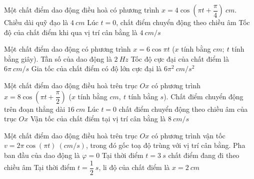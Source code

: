 \setcounter{ex}{0}
\setcounter{paragraph}{0}
\PhanII
\begin{ex}
Một chất điểm dao động điều hoà có phương trình $x=4 \cos (\pi t+\dfrac{\pi}{4})\ cm$.
{Chiều dài quỹ đạo là $4 \ cm$}
{\True Lúc $t=0$, chất điểm chuyển động theo chiều âm}
{Tốc độ của chất điểm khi qua vị trí cân bằng là $4 \ cm/s$}
\loigiai{
\begin{itemchoice}
\itemch
\itemch
\itemch
\itemch
\end{itemchoice}
}
\end{ex} 
\begin{ex}
Một chất điểm dao động có phương trình $x=6 \cos \pi t$ ($x$ tính bằng $cm;\ t$ tính bằng giây).
{Tần số của dao động là $2 \ Hz$}
{\True Tốc độ cực đại của chất điểm là $6 \pi\ cm/s$}
{\True Gia tốc của chất điểm có độ lớn cực đại là $6 \pi^2 \ cm/s^2$}
\loigiai{
\begin{itemchoice}
\itemch
\itemch
\itemch
\itemch
\end{itemchoice}

}
\end{ex} 
\begin{ex}
Một chất điểm dao động điều hoà trên trục $O x$ có phương trình $x=8 \cos \left(\pi t+\dfrac{\pi}{2}\right)$ ($x$ tính bằng $cm,\ t$ tính bằng $s$).
{\True Chất điểm chuyển động trên đoạn thẳng dài $16 \ cm$}
{\True Lúc $t=0$ chất điểm chuyển động theo chiều âm của trục $O x$}
{Vận tốc của chất điểm tại vị trí cân bằng là $8 \ cm/s$}
\loigiai{
\begin{itemchoice}
\itemch
\itemch
\itemch
\itemch
\end{itemchoice}
}
\end{ex} 
\begin{ex}
Một chất điểm dao động điều hoà trên trục $Ox$ có phương trình vận tốc 
$v = 2\pi \cos(\pi t)\ (cm/s)$, 
trong đó gốc toạ độ trùng với vị trí cân bằng.
{Pha ban đầu của dao động là $\varphi = 0$}
{\True Tại thời điểm $t=3\ s$ chất điểm đang đi theo chiều âm}
{Tại thời điểm $t = \dfrac{1}{2}\ s$, li độ của chất điểm là $x = 2\ cm$}
\loigiai{
\begin{itemchoice}
\itemch 
\itemch 
\itemch 
\itemch 
\end{itemchoice}
}
\end{ex}



